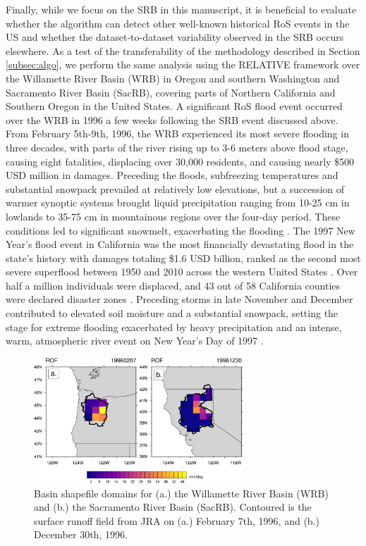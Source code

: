 \documentclass[nhess, manuscript]{copernicus}
\begin{document}
Finally, while we focus on the SRB in this manuscript, it is beneficial to evaluate whether the algorithm can detect other well-known historical RoS events in the US and whether the dataset-to-dataset variability observed in the SRB occurs elsewhere.
As a test of the transferability of the methodology described in Section \ref{subsec:algo}, we perform the same analysis using the RELATIVE framework over the Willamette River Basin (WRB) in Oregon and southern Washington and Sacramento River Basin (SacRB), covering parts of Northern California and Southern Oregon in the United States.
A significant RoS flood event occurred over the WRB in 1996 a few weeks following the SRB event discussed above.
From February 5th-9th, 1996, the WRB experienced its most severe flooding in three decades, with parts of the river rising up to 3-6 meters above flood stage, causing eight fatalities, displacing over 30,000 residents, and causing nearly \$500 USD million in damages.
Preceding the floods, subfreezing temperatures and substantial snowpack prevailed at relatively low elevations, but a succession of warmer synoptic systems brought liquid precipitation ranging from 10-25 cm in lowlands to 35-75 cm in mountainous regions over the four-day period.
These conditions led to significant snowmelt, exacerbating the flooding \citep{halpert1997climate,colle2000february}.
The 1997 New Year's flood event in California was the most financially devastating flood in the state's history with damages totaling \$1.6 USD billion, ranked as the second most severe superflood between 1950 and 2010 across the western United States \citep{tarouilly2021western}.
Over half a million individuals were displaced, and 43 out of 58 California counties were declared disaster zones \citep{lott1997}.
Preceding storms in late November and December contributed to elevated soil moisture and a substantial snowpack, setting the stage for extreme flooding exacerbated by heavy precipitation and an intense, warm, atmospheric river event on New Year's Day of 1997 \citep{galewsky2005moist,rhoades2023recreating}.

\begin{figure}
\noindent\includegraphics[width=0.7\textwidth]{f09-other_basins_ROF.pdf}
\caption{Basin shapefile domains for (a.) the Willamette River Basin (WRB) and (b.) the Sacramento River Basin (SacRB). Contoured is the surface runoff field from JRA on (a.) February 7th, 1996, and (b.) December 30th, 1996.}
\label{fig:otherbasins}
\end{figure}
\end{document}
